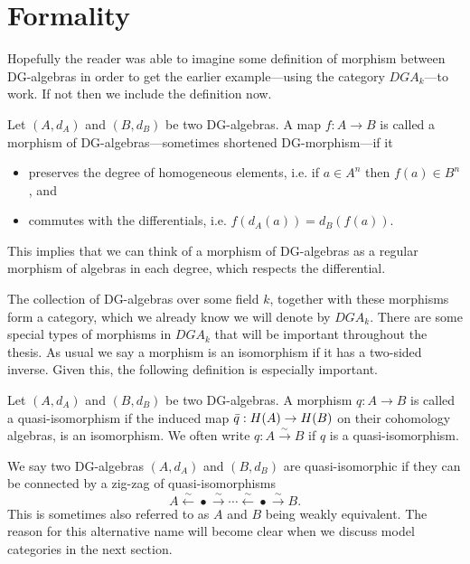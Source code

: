 \section{Formality}
\label{sec:formality}

Hopefully the reader was able to imagine some definition of morphism between DG-algebras in order to get the earlier example---using the category $DGA_k$---to work. If not then we include the definition now. 

\begin{definition}[DG morphism]
Let $(A, d_A)$ and $(B, d_B)$ be two DG-algebras. A map $f:A\longrightarrow B$ is called a morphism of DG-algebras---sometimes shortened DG-morphism---if it
\begin{itemize}
    \item preserves the degree of homogeneous elements, i.e. if $a\in A^n$ then $f(a)\in B^n$, and
    \item commutes with the differentials, i.e. $f(d_A(a))=d_B(f(a))$. 
\end{itemize}
\end{definition}

This implies that we can think of a morphism of DG-algebras as a regular morphism of algebras in each degree, which respects the differential.

The collection of DG-algebras over some field $k$, together with these morphisms form a category, which we already know we will denote by $DGA_k$. There are some special types of morphisms in $DGA_k$ that will be important throughout the thesis. As usual we say a morphism is an isomorphism if it has a two-sided inverse. Given this, the following definition is especially important. 

\begin{definition}
Let $(A, d_A)$ and $(B, d_B)$ be two DG-algebras. A morphism $q:A\longrightarrow B$ is called a quasi-isomorphism if the induced map $\Bar{q}:H(A)\rightarrow H(B)$ on their cohomology algebras, is an isomorphism. We often write $q:A\overset{\sim}\longrightarrow B$ if $q$ is a quasi-isomorphism. 
\end{definition}

\begin{definition}
We say two DG-algebras $(A, d_A)$ and $(B, d_B)$ are quasi-isomorphic if they can be connected by a zig-zag of quasi-isomorphisms 
\begin{equation*}
    A \overset{\sim}\longleftarrow \bullet \overset{\sim}\longrightarrow \cdots \overset{\sim}\longleftarrow \bullet \overset{\sim}\longrightarrow B .
\end{equation*}
This is sometimes also referred to as $A$ and $B$ being weakly equivalent. The reason for this alternative name will become clear when we discuss model categories in the next section. 
\end{definition}

